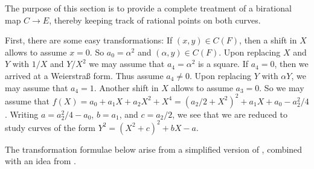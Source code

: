 \documentclass[12pt]{amsart}
\theoremstyle{plain}
\theoremstyle{definition}
\numberwithin{equation}{section}
\begin{document}
The purpose of this section is to provide a complete treatment of a
birational map $C\to E$, thereby keeping track of rational
points on both curves.

First, there are some easy transformations: If $(x,y)\in C(F)$, then a
shift in $X$ allows to assume $x=0$. So $a_0=\alpha^2$ and
$(\alpha, y)\in C(F)$. Upon replacing $X$ and $Y$ with $1/X$ and
$Y/X^2$ we may assume that $a_4=\alpha^2$ is a square. If $a_4=0$,
then we arrived at a Weierstraß form. Thus assume $a_4\ne0$. Upon
replacing $Y$ with $\alpha Y$, we may assume that $a_4=1$. Another
shift in $X$ allows to assume $a_3=0$. So we may assume that
$f(X)=a_0+a_1X+a_2X^2+X^4=(a_2/2+X^2)^2+a_1X+a_0-a_2^2/4$. Writing
$a=a_2^2/4-a_0$, $b=a_1$, and $c=a_2/2$, we see that we are reduced to
study curves of the form $Y^2=(X^2+c)^2 + bX - a$.

The transformation formulae below arise from a simplified version of
\cite{connell___addendum}, combined with an idea from \cite[Chapter
8(iii)]{cassels___ec}.
\end{document}
